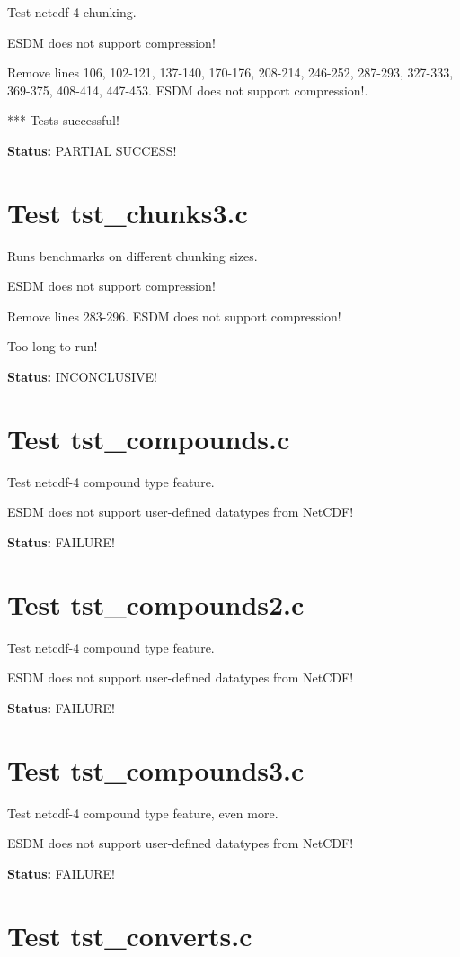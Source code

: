 Test netcdf-4 chunking.

ESDM does not support compression!

Remove lines 106, 102-121, 137-140, 170-176, 208-214, 246-252, 287-293, 327-333, 369-375, 408-414, 447-453. ESDM does not support compression!.

*** Tests successful!

{\bf \large Status: } PARTIAL SUCCESS!

\section{Test tst\_chunks3.c}

Runs benchmarks on different chunking sizes.

ESDM does not support compression!

Remove lines 283-296. ESDM does not support compression!

Too long to run!

{\bf \large Status: } INCONCLUSIVE!

\section{Test tst\_compounds.c}

Test netcdf-4 compound type feature.

ESDM does not support user-defined datatypes from NetCDF!

{\bf \large Status: } FAILURE!

\section{Test tst\_compounds2.c}

Test netcdf-4 compound type feature.

ESDM does not support user-defined datatypes from NetCDF!

{\bf \large Status: } FAILURE!

\section{Test tst\_compounds3.c}

Test netcdf-4 compound type feature, even more.

ESDM does not support user-defined datatypes from NetCDF!

{\bf \large Status: } FAILURE!

\section{Test tst\_converts.c}

